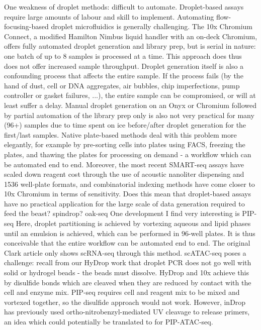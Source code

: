 One weakness of droplet methods: difficult to automate.
Droplet-based assays require large amounts of labour and skill to implement. Automating flow-focusing-based droplet microfluidics is generally challenging. The 10x Chromium Connect, a modified Hamilton Nimbus liquid handler with an on-deck Chromium, offers fully automated droplet generation and library prep, but is serial in nature: one batch of up to 8 samples is processed at a time. This approach does thus does not offer increased sample throughput. Droplet generation itself is also a confounding process that affects the entire sample. If the process fails (by the hand of dust, cell or DNA aggregates, air bubbles, chip imperfections, pump controller or gasket failures, ...), the entire sample can be compromised, or will at least suffer a delay. Manual droplet generation on an Onyx or Chromium followed by partial automation of the library prep only is also not very practical for many (96+) samples due to time spent on ice before/after droplet generation for the first/last samples. Native plate-based methods deal with this problem more elegantly, for example by pre-sorting cells into plates using FACS, freezing the plates, and thawing the plates for processing on demand - a workflow which can be automated end to end. Moreover, the most recent SMART-seq assays have scaled down reagent cost through the use of acoustic nanoliter dispensing and 1536 well-plate formats, and combinatorial indexing methods have come closer to 10x Chromium in terms of sensitivity. Does this mean that droplet-based assays have no practical application for the large scale of data generation required to feed the beast?
spindrop?
oak-seq
One development I find very interesting is PIP-seq Here, droplet partitioning is achieved by vortexing aqueous and lipid phases until an emulsion is achieved, which can be performed in 96-well plates. It is thus conceivable that the entire workflow can be automated end to end. The original Clark article only shows scRNA-seq through this method. scATAC-seq poses a challenge: recall from our HyDrop work that droplet PCR does not go well with solid or hydrogel beads - the beads must dissolve. HyDrop and 10x achieve this by disulfide bonds which are cleaved when they are reduced by contact with the cell and enzyme mix. PIP-seq requires cell and reagent mix to be mixed and vortexed together, so the disulfide approach would not work. However, inDrop has previously used ortho-nitrobenzyl-mediated UV cleavage to release primers, an idea which could potentially be translated to for PIP-ATAC-seq.

